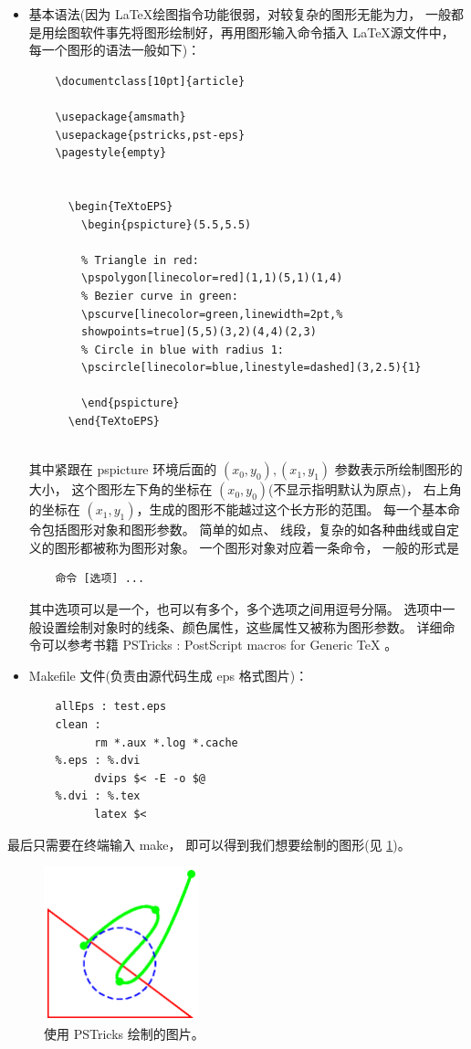 \begin{itemize}
	
	\item 基本语法(因为 \LaTeX 绘图指令功能很弱，对较复杂的图形无能为力，
	一般都是用绘图软件事先将图形绘制好，再用图形输入命令插入 \LaTeX 源文件中，
	每一个图形的语法一般如下)：
	\begin{verbatim}
	\documentclass[10pt]{article}

	\usepackage{amsmath}
	\usepackage{pstricks,pst-eps}
	\pagestyle{empty}

	
  	  \begin{TeXtoEPS}
    	\begin{pspicture}(5.5,5.5)

      	% Triangle in red:
      	\pspolygon[linecolor=red](1,1)(5,1)(1,4)
      	% Bezier curve in green:
      	\pscurve[linecolor=green,linewidth=2pt,%
      	showpoints=true](5,5)(3,2)(4,4)(2,3)
     	% Circle in blue with radius 1:
      	\pscircle[linecolor=blue,linestyle=dashed](3,2.5){1}

    	\end{pspicture}
  	  \end{TeXtoEPS}
	
	\end{verbatim}
	其中紧跟在 pspicture 环境后面的 $(x_0,y_0), (x_1,y_1)$ 参数表示所绘制图形的大小，
	这个图形左下角的坐标在 $(x_0,y_0)$(不显示指明默认为原点)，
	右上角的坐标在 $(x_1,y_1)$，生成的图形不能越过这个长方形的范围。
	每一个基本命令包括图形对象和图形参数。
	简单的如点、 线段，复杂的如各种曲线或自定义的图形都被称为图形对象。
	一个图形对象对应着一条命令， 一般的形式是
	\begin{verbatim}
	命令 [选项] ... 
	\end{verbatim}	
	其中选项可以是一个，也可以有多个，多个选项之间用逗号分隔。
	选项中一般设置绘制对象时的线条、颜色属性，这些属性又被称为图形参数。
	详细命令可以参考书籍
	PSTricks : PostScript macros for Generic TeX \cite{van1993pstricks}。
	\item Makefile 文件(负责由源代码生成 eps 格式图片)：
	\begin{verbatim}
	allEps : test.eps
	clean :
　　　		rm *.aux *.log *.cache
	%.eps : %.dvi
　　　		dvips $< -E -o $@
	%.dvi : %.tex
　　　		latex $<
	\end{verbatim}
\end{itemize}

最后只需要在终端输入 make，
即可以得到我们想要绘制的图形(见 \ref{fig:pstricks})。

\begin{figure}[htbp]
	\centering
	\includegraphics[width=0.4\textwidth]{eps/pstricks}
	\caption{使用 PSTricks 绘制的图片。}
	\label{fig:pstricks}
\end{figure}




